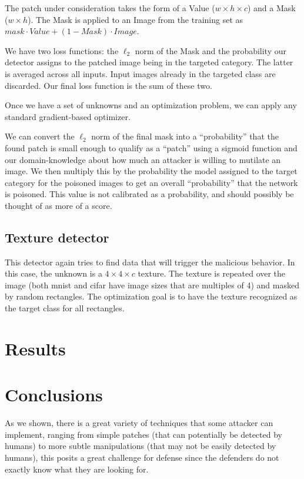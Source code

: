 \documentclass[letterpaper, 10 pt, conference]{ieeeconf}  %
\begin{document}
The patch under consideration takes the form of a Value ($w \times h
\times c$) and a Mask ($w \times h$).  The Mask is applied to an
Image from the training set as $mask \cdot Value + (1 - Mask) \cdot
Image$.

We have two loss functions: the $\ell_2$ norm of the Mask and the
probability our detector assigns to the patched image being in the
targeted category.  The latter is averaged across all inputs.  Input
images already in the targeted class are discarded.  Our final loss
function is the sum of these two.

Once we have a set of unknowns and an optimization problem, we can
apply any standard gradient-based optimizer.

We can convert the $\ell_2$ norm of the final mask into a ``probability''
that the found patch is small enough to qualify as a ``patch'' using a
sigmoid function and our domain-knowledge about how much an attacker
is willing to mutilate an image.  We then multiply this by the
probability the model assigned to the target category for the poisoned
images to get an overall ``probability'' that the network is
poisoned.  This value is not calibrated as a probability, and should
possibly be thought of as more of a score.


\subsection{Texture detector}


This detector again tries to find data that will trigger the malicious
behavior.  In this case, the unknown is a $4\times 4\times c$ texture.  The
texture is repeated over the image (both mnist and cifar have image
sizes that are multiples of 4) and masked by random rectangles.  The
optimization goal is to have the texture recognized as the target
class for all rectangles.

\section{Results}


\section{Conclusions}

As we shown, there is a great variety of techniques that some attacker can
implement, ranging from simple patches (that can potentially be detected by
humans) to more subtle manipulations (that may not be easily detected
by humans), this posits a great challenge for defense since the defenders do
not exactly know what they are looking for.
\end{document}
